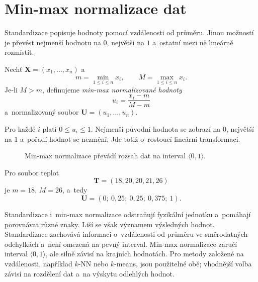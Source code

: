 \section{Min-max normalizace dat}\label{sec:ai-minmax}

Standardizace popisuje hodnoty pomocí vzdálenosti od průměru. Jinou možností je převést nejmenší hodnotu na \(0\), největší na \(1\) a~ostatní mezi ně lineárně rozmístit.

\begin{definition}\label{def:ai-minmax}
    Nechť \(\mathbf{X}=(x_1,\ldots,x_n)\) a
    \[
        m=\min_{1\leqslant i\leqslant n}x_i,
        \qquad
        M=\max_{1\leqslant i\leqslant n}x_i.
    \]
    Je-li \(M>m\), definujeme \emph{min-max normalizované hodnoty}
    \[
        u_i=\frac{x_i-m}{M-m}
    \]
    a~normalizovaný soubor \(\mathbf{U}=(u_1,\ldots,u_n)\).
\end{definition}

Pro každé \(i\) platí \(0\leqslant u_i\leqslant 1\). Nejmenší původní hodnota se zobrazí na \(0\), největší na \(1\) a~pořadí hodnot se nezmění. Jde totiž o~rostoucí lineární transformaci.

\begin{figure}[ht]
    \centering
    
    \caption{Min-max normalizace převádí rozsah dat na interval \(\langle0,1\rangle\).}
    \label{fig:ai-minmax}
\end{figure}

Pro soubor teplot
\[
    \mathbf{T}=(18,20,20,21,26)
\]
je \(m=18\), \(M=26\), a~tedy
\[
    \mathbf{U}
    =
    (0;\ 0{,}25;\ 0{,}25;\ 0{,}375;\ 1).
\]

Standardizace i~min-max normalizace odstraňují fyzikální jednotku a~pomáhají porovnávat různé znaky. Liší se však významem výsledných hodnot. Standardizace zachovává informaci o~vzdálenosti od průměru ve směrodatných odchylkách a~není omezená na pevný interval. Min-max normalizace zaručí interval \(\langle0,1\rangle\), ale silně závisí na krajních hodnotách. Pro metody založené na vzdálenosti, například \(k\)-NN nebo \(k\)-means, jsou použitelné obě; vhodnější volba závisí na rozdělení dat a~na výskytu odlehlých hodnot.

